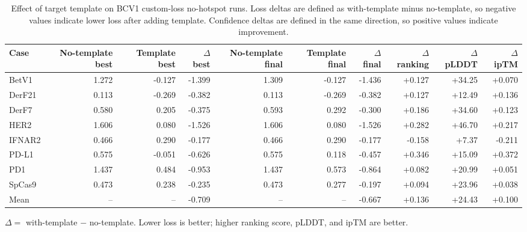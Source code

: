 \begin{table}[htbp]
\centering
\small
\caption{Effect of target template on BCV1 custom-loss no-hotspot runs. Loss deltas are defined as with-template minus no-template, so negative values indicate lower loss after adding template. Confidence deltas are defined in the same direction, so positive values indicate improvement.}
\label{tab:bcv1_custom_loss_template_effect}
\begin{tabular}{lrrrrrrrrr}
\toprule
Case & No-template best & Template best & $\Delta$ best & No-template final & Template final & $\Delta$ final & $\Delta$ ranking & $\Delta$ pLDDT & $\Delta$ ipTM \\
\midrule
BetV1 & 1.272 & -0.127 & -1.399 & 1.309 & -0.127 & -1.436 & +0.127 & +34.25 & +0.070 \\
DerF21 & 0.113 & -0.269 & -0.382 & 0.113 & -0.269 & -0.382 & +0.127 & +12.49 & +0.136 \\
DerF7 & 0.580 & 0.205 & -0.375 & 0.593 & 0.292 & -0.300 & +0.186 & +34.60 & +0.123 \\
HER2 & 1.606 & 0.080 & -1.526 & 1.606 & 0.080 & -1.526 & +0.282 & +46.70 & +0.217 \\
IFNAR2 & 0.466 & 0.290 & -0.177 & 0.466 & 0.290 & -0.177 & -0.158 & +7.37 & -0.211 \\
PD-L1 & 0.575 & -0.051 & -0.626 & 0.575 & 0.118 & -0.457 & +0.346 & +15.09 & +0.372 \\
PD1 & 1.437 & 0.484 & -0.953 & 1.437 & 0.573 & -0.864 & +0.082 & +20.99 & +0.051 \\
SpCas9 & 0.473 & 0.238 & -0.235 & 0.473 & 0.277 & -0.197 & +0.094 & +23.96 & +0.038 \\
\midrule
Mean & -- & -- & -0.709 & -- & -- & -0.667 & +0.136 & +24.43 & +0.100 \\
\bottomrule
\end{tabular}

\vspace{0.4em}
\footnotesize{$\Delta =$ with-template $-$ no-template. Lower loss is better; higher ranking score, pLDDT, and ipTM are better.}
\end{table}
